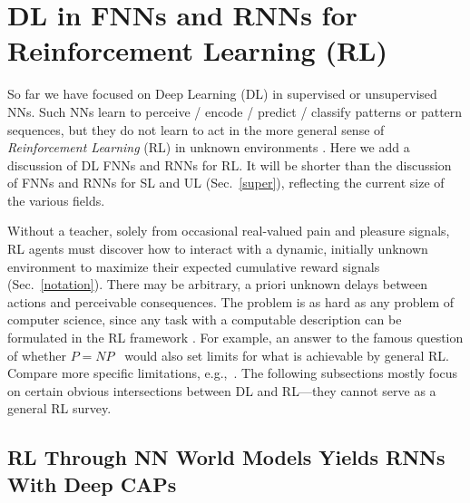 \documentclass[letterpaper]{article}
\begin{document}
\begin{sloppypar}
\newpage
\section{DL in FNNs and RNNs for Reinforcement Learning (RL)}
\label{deeprl}

So far we have focused on 
Deep Learning (DL) in supervised or unsupervised NNs.
Such NNs learn to perceive / encode / predict / classify 
patterns or pattern sequences, 
but they do not learn to act in the more general
sense of {\em Reinforcement Learning} (RL) in unknown environments \citep[see surveys, e.g.,][]{Kaelbling:96,Sutton:98,wiering2012}.
Here we add a discussion of DL FNNs and RNNs for RL. 
It will be shorter than the discussion of FNNs and RNNs for SL and UL (Sec.~\ref{super}),
reflecting the current size of the various fields.

Without a teacher, solely from occasional  real-valued
pain and pleasure signals,  RL agents must discover how to interact with a
dynamic, initially unknown environment to maximize their expected cumulative reward
signals (Sec.~\ref{notation}).
There may be arbitrary, a priori unknown delays between actions and perceivable consequences.
The problem is as hard as any problem of computer science,
since any task with a computable description can be formulated in the RL framework \citep[e.g.,][]{Hutter:05book+}.
For example, an answer to the famous question of 
whether $P=NP$~\citep{Levin:73,Cook:71}
would also set limits for what is achievable by general RL.
Compare more specific limitations, e.g.,~\citep{blondel2000,madani2003,vlassis2012}.
The following subsections mostly focus on certain obvious intersections 
between DL and RL---they cannot serve as a general RL survey.  

\subsection{RL Through NN World Models Yields RNNs With Deep CAPs}
\label{worrl}


\end{sloppypar}
\end{document}
